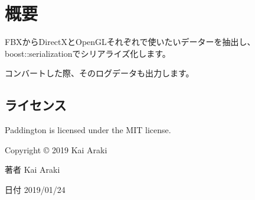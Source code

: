 \hypertarget{index_概要}{}\section{概要}\label{index_概要}
F\+B\+Xから\+Direct\+Xと\+Open\+G\+Lそれぞれで使いたいデーターを抽出し、boost\+::serializationでシリアライズ化します。

コンバートした際、そのログデータも出力します。 \hypertarget{index_ライセンス}{}\subsection{ライセンス}\label{index_ライセンス}
Paddington is licensed under the M\+IT license. ~\newline


Copyright \copyright{} 2019 Kai Araki \begin{DoxyAuthor}{著者}
Kai Araki ~\newline

\end{DoxyAuthor}
\begin{DoxyDate}{日付}
2019/01/24 
\end{DoxyDate}
